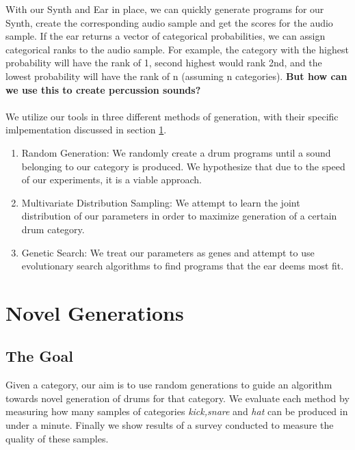 \documentclass{nime-alternate} %
\begin{document}
With our Synth and Ear in place, we can quickly generate programs for our Synth, create the corresponding audio sample and get the scores for the audio sample. If the ear returns a vector of categorical probabilities, we can assign categorical ranks to the audio sample. For example, the category with the highest probability will have the rank of 1, second highest would rank 2nd, and the lowest probability will have the rank of n (assuming n categories).\textbf{
But how can we use this to create percussion sounds?}\\\\
We utilize our tools in three different methods of generation, with their specific imlpementation discussed in section \ref{gens}.
\begin {enumerate} [label=(\roman*)]
\item Random Generation: We randomly create a drum programs until a sound belonging to our category is produced. We hypothesize that due to the speed of our experiments, it is a viable approach.
\item Multivariate Distribution Sampling: We attempt to learn the joint distribution of our parameters in order to maximize generation of a certain drum category. 
\item Genetic Search: We treat our parameters as genes and attempt to use evolutionary search algorithms to find programs that the ear deems most fit.\\
\end {enumerate} 

\section{Novel Generations}
\label{gens}
\subsection{The Goal}
 Given a category, our aim is to use random generations to guide an algorithm towards novel generation of drums for that category. We evaluate each method by measuring how many samples of categories \textit{kick,snare} and \textit{hat} can be produced in under a minute. Finally we show results of a survey conducted to measure the quality of these samples. 
\end{document}

